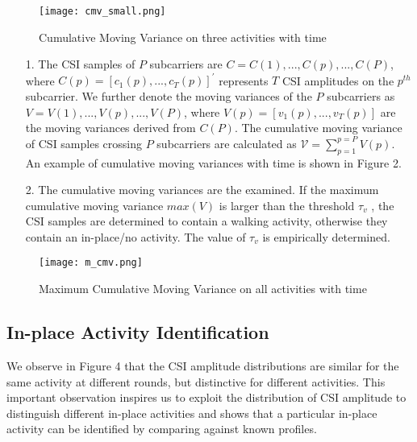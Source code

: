 \documentclass[letterpaper]{article}
\begin{document}
\begin{figure}
	\centering
	\texttt{[image: cmv\_small.png]}
	\caption{\label{} Cumulative Moving Variance on three activities with time}
\end{figure}


\begin{enumerate}
	\item[1.] The CSI samples of \(P\) subcarriers are \(C = {C(1),...,C(p),...,C(P)}\), where \(C(p)=[c_1(p),...,c_T(p)]^{'}\) represents \(T\) CSI amplitudes on the \(p^{th}\) subcarrier. We further denote the moving variances of the \(P\) subcarriers as \(V = {V(1), . . . , V(p), . . . , V(P )}\), where \(V(p) = [v_1 (p) , . . . , v_T (p)]\) are the moving variances derived from \(C(P)\). The cumulative moving variance of CSI samples crossing \(P\) subcarriers are calculated as \(\mathcal{V} = \sum_{p=1}^{p=P} V(p)\). An example of cumulative moving variances with time is shown in Figure 2. 
	
	\item[2.] The cumulative moving variances are the examined. If the maximum cumulative moving variance \(max(V)\) is larger than the threshold \(\tau_v\) , the CSI samples are determined to contain a walking activity, otherwise they contain an in-place/no activity. The value of \(\tau_v\) is empirically determined. 
\end{enumerate}

\begin{figure}
	\centering
	\texttt{[image: m\_cmv.png]}
	\caption{\label{} Maximum Cumulative Moving Variance on all activities with time}
\end{figure}

\subsection{In-place Activity Identification}

We observe in Figure 4 that the CSI amplitude distributions are similar for the same activity at different rounds, but distinctive for different activities. This important observation inspires us to exploit the distribution of CSI amplitude to distinguish different in-place activities and shows that a particular in-place activity can be identified by comparing against known profiles.
\end{document}
